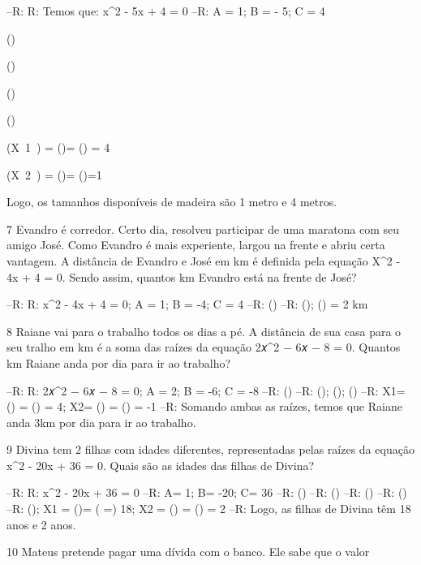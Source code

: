 {--R: R: Temos que: x^2 - 5x + 4 = 0
--R: A = 1; B = - 5; C = 4

()

()

()

()

(X~1~) = ()= () = 4

(X~2~) = ()= ()=1

Logo, os tamanhos disponíveis de madeira são 1 metro e 4 metros.

\num{7} Evandro é corredor. Certo dia, resolveu participar de uma maratona
com seu amigo José. Como Evandro é mais experiente, largou na frente e
abriu certa vantagem. A distância de Evandro e José em km é definida
pela equação X^2 - 4x + 4 = 0. Sendo assim, quantos km Evandro está na
frente de José?

--R: R: x^2 - 4x + 4 = 0; A = 1; B = -4; C = 4
--R: ()
--R: (); () = 2 km

\num{8} Raiane vai para o trabalho todos os dias a pé. A distância de sua
casa para o seu tralho em km é a soma das raízes da equação 2𝑥^2 − 6𝑥 − 8
= 0. Quantos km Raiane anda por dia para ir ao trabalho?

--R: R: 2𝑥^2 − 6𝑥 − 8 = 0; A = 2; B = -6; C = -8
--R: ()
--R: (); (); ()
--R: X1= () = () = 4; X2= () = () = -1
--R: Somando ambas as raízes, temos que Raiane anda 3km por dia para ir ao trabalho.

\num{9} Divina tem 2 filhas com idades diferentes, representadas pelas raízes
da equação x^2 - 20x + 36 = 0. Quais são as idades das filhas de Divina?

--R: R: x^2 - 20x + 36 = 0
--R: A= 1; B= -20; C= 36
--R: ()
--R: ()
--R: ()
--R: ()
--R: (); X1 = ()= ( =) 18; X2 = () = () = 2
--R: Logo, as filhas de Divina têm 18 anos e 2 anos.

\num{10} Mateus pretende pagar uma dívida com o banco. Ele sabe que o valor

}
